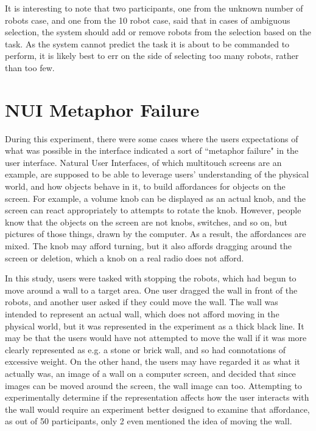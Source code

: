 It is interesting to note that two participants, one from the unknown number of robots case, and one from the 10 robot case, said that in cases of ambiguous selection, the system should add or remove robots from the selection based on the task. 
As the system cannot predict the task it is about to be commanded to perform, it is likely best to err on the side of selecting too many robots, rather than too few. 

\section{NUI Metaphor Failure}

During this experiment, there were some cases where the users expectations of what was possible in the interface indicated a sort of ``metaphor failure" in the user interface. 
Natural User Interfaces, of which multitouch screens are an example, are supposed to be able to leverage users' understanding of the physical world, and how objects behave in it, to build affordances for objects on the screen. 
For example, a volume knob can be displayed as an actual knob, and the screen can react appropriately to attempts to rotate the knob. 
However, people know that the objects on the screen are not knobs, switches, and so on, but pictures of those things, drawn by the computer. 
As a result, the affordances are mixed. 
The knob may afford turning, but it also affords dragging around the screen or deletion, which a knob on a real radio does not afford. 

In this study, users were tasked with stopping the robots, which had begun to move around a wall to a target area. 
One user dragged the wall in front of the robots, and another user asked if they could move the wall. 
The wall was intended to represent an actual wall, which does not afford moving in the physical world, but it was represented in the experiment as a thick black line. 
It may be that the users would have not attempted to move the wall if it was more clearly represented as e.g. a stone or brick wall, and so had connotations of excessive weight. 
On the other hand, the users may have regarded it as what it actually was, an image of a wall on a computer screen, and decided that since images can be moved around the screen, the wall image can too. 
Attempting to experimentally determine if the representation affects how the user interacts with the wall would require an experiment better designed to examine that affordance, as out of 50 participants, only 2 even mentioned the idea of moving the wall.
